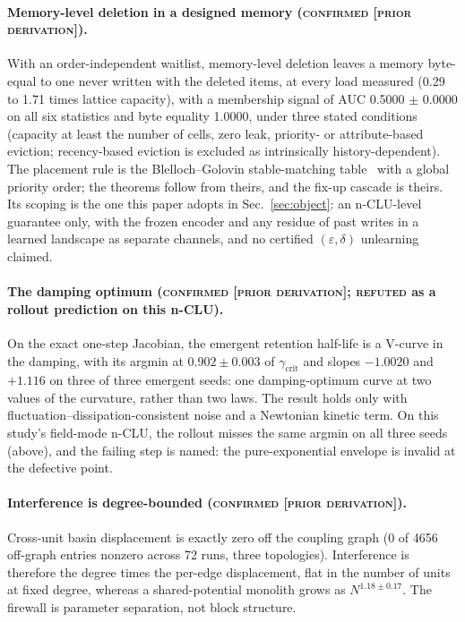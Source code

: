 \documentclass{article} %
\begin{document}
\paragraph{Memory-level deletion in a designed memory (\textsc{confirmed [prior
derivation]}).} With an order-independent waitlist, memory-level deletion leaves a memory
byte-equal to one never written with the deleted items, at every load measured (0.29 to 1.71 times lattice capacity), with a membership signal of AUC 0.5000 $\pm$ 0.0000 on all
six statistics and byte equality 1.0000, under three stated conditions (capacity at least the number
of cells, zero leak, priority- or attribute-based eviction; recency-based eviction is excluded as
intrinsically history-dependent). %
The placement rule is the Blelloch--Golovin stable-matching table~\citep{blelloch2007strongly} with a global priority order;
the theorems follow from theirs, and the fix-up cascade is theirs. Its scoping is the one this
paper adopts in Sec.~\ref{sec:object}: an n-CLU-level guarantee only, with the frozen encoder and any
residue of past writes in a learned landscape as separate channels, and no certified
$(\varepsilon,\delta)$ unlearning claimed. %

\paragraph{The damping optimum (\textsc{confirmed [prior derivation]}; \textsc{refuted} as a
rollout prediction on this n-CLU).} On the exact one-step Jacobian, the emergent retention
half-life is a V-curve in the damping, with its argmin at $0.902\pm0.003$ of
$\gamma_{\text{crit}}$ and slopes $-1.0020$ and $+1.116$ on three of three emergent seeds: one
damping-optimum curve at two values of the curvature, rather than two laws.
The result holds only with fluctuation--dissipation-consistent noise and a Newtonian kinetic term.
On this study's field-mode n-CLU, the rollout misses the same argmin on all three seeds (above), and the
failing step is named: the pure-exponential envelope is invalid at the defective point.

\paragraph{Interference is degree-bounded (\textsc{confirmed [prior derivation]}).} Cross-unit
basin displacement is exactly zero off the coupling graph (0 of 4656 off-graph entries nonzero
across 72 runs, three topologies). Interference is therefore the degree times the per-edge
displacement, flat in the number of units at fixed degree, whereas a shared-potential monolith
grows as $N^{1.18\pm0.17}$. The firewall is parameter separation, not block structure.
\end{document}
